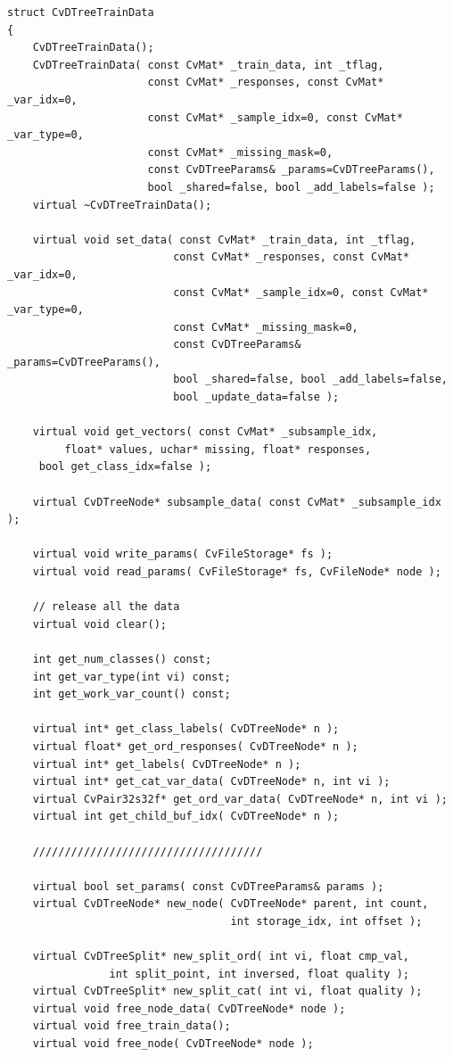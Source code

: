 \begin{lstlisting}
struct CvDTreeTrainData
{
    CvDTreeTrainData();
    CvDTreeTrainData( const CvMat* _train_data, int _tflag,
                      const CvMat* _responses, const CvMat* _var_idx=0,
                      const CvMat* _sample_idx=0, const CvMat* _var_type=0,
                      const CvMat* _missing_mask=0,
                      const CvDTreeParams& _params=CvDTreeParams(),
                      bool _shared=false, bool _add_labels=false );
    virtual ~CvDTreeTrainData();

    virtual void set_data( const CvMat* _train_data, int _tflag,
                          const CvMat* _responses, const CvMat* _var_idx=0,
                          const CvMat* _sample_idx=0, const CvMat* _var_type=0,
                          const CvMat* _missing_mask=0,
                          const CvDTreeParams& _params=CvDTreeParams(),
                          bool _shared=false, bool _add_labels=false,
                          bool _update_data=false );

    virtual void get_vectors( const CvMat* _subsample_idx,
         float* values, uchar* missing, float* responses, 
	 bool get_class_idx=false );

    virtual CvDTreeNode* subsample_data( const CvMat* _subsample_idx );

    virtual void write_params( CvFileStorage* fs );
    virtual void read_params( CvFileStorage* fs, CvFileNode* node );

    // release all the data
    virtual void clear();

    int get_num_classes() const;
    int get_var_type(int vi) const;
    int get_work_var_count() const;

    virtual int* get_class_labels( CvDTreeNode* n );
    virtual float* get_ord_responses( CvDTreeNode* n );
    virtual int* get_labels( CvDTreeNode* n );
    virtual int* get_cat_var_data( CvDTreeNode* n, int vi );
    virtual CvPair32s32f* get_ord_var_data( CvDTreeNode* n, int vi );
    virtual int get_child_buf_idx( CvDTreeNode* n );

    ////////////////////////////////////

    virtual bool set_params( const CvDTreeParams& params );
    virtual CvDTreeNode* new_node( CvDTreeNode* parent, int count,
                                   int storage_idx, int offset );

    virtual CvDTreeSplit* new_split_ord( int vi, float cmp_val,
                int split_point, int inversed, float quality );
    virtual CvDTreeSplit* new_split_cat( int vi, float quality );
    virtual void free_node_data( CvDTreeNode* node );
    virtual void free_train_data();
    virtual void free_node( CvDTreeNode* node );


\end{lstlisting}
